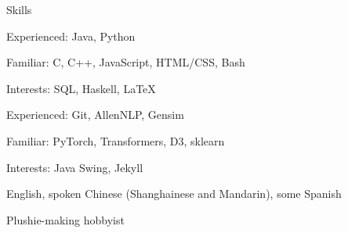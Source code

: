 
\begin{rubric}{Skills}
    \par Experienced: Java, Python
    \par Familiar: C, C++, JavaScript, HTML/CSS, Bash
    \par Interests: SQL, Haskell, \LaTeX
{}
    \par Experienced: Git, AllenNLP, Gensim
    \par Familiar: PyTorch, Transformers, D3, sklearn
    \par Interests: Java Swing, Jekyll
    \par English, spoken Chinese (Shanghainese and Mandarin), some Spanish
\entry*[Misc.]
    \par Plushie-making hobbyist
\end{rubric}
